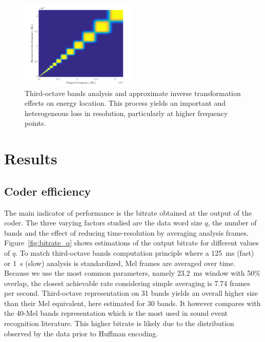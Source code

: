 \documentclass[sensors,article,submit,moreauthors,pdftex,10pt,a4paper]{mdpi}
\begin{document}
\begin{figure}[htbp]
	\centering
		\includegraphics[width=0.5\textwidth]{figures/freq.png}
	\caption{Third-octave bands analysis and approximate inverse transformation effects on energy location. This process yields an important and heterogeneous loss in resolution, particularly at higher frequency points.}
	\label{fig:freq}
\end{figure}

\section{Results} \label{sec:results}

\subsection{Coder efficiency} \label{sec:efficiency_r}

The main indicator of performance is the bitrate obtained at the output of the coder. The three varying factors studied are the data word size $q$, the number of bands and the effect of reducing time-resolution by averaging analysis frames. Figure~\ref{fig:bitrate_q} shows estimations of the output bitrate for different values of $q$. To match third-octave bands computation principle where a 125~ms (fast) or 1~s (slow) analysis is standardized, Mel frames are averaged over time. Because we use the most common parameters, namely 23.2~ms window with 50\% overlap, the closest achievable rate considering simple averaging is 7.74 frames per second. Third-octave representation on 31 bands yields an overall higher size than their Mel equivalent, here estimated for 30 bands. It however compares with the 40-Mel bands representation which is the most used in sound event recognition literature. This higher bitrate is likely due to the distribution observed by the data prior to Huffman encoding.
\end{document}
